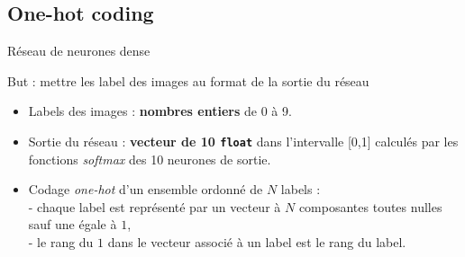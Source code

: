 \documentclass[10pt,serif,mathserif,compress,hyperref={colorlinks}]{beamer}
\begin{document}
\subsection{One-hot coding}

\begin{frame}{Réseau de neurones dense}

  \begin{tcolorbox}[title=Codage {\em One-hot} des labels]  

    But : mettre les label des images au format de la sortie du réseau

    {\small
        \begin{itemize}
        \item Labels des images  : \textbf{nombres entiers} de 0 à 9.
        \item Sortie du réseau : \textbf{vecteur de 10 \texttt{float}} dans l'intervalle [0,1] calculés par les fonctions {\em softmax} des 10 neurones de sortie.
        \item Codage {\em one-hot} d'un ensemble ordonné de $N$ labels : \\[1mm]
          - chaque label est représenté par un vecteur à $N$ composantes toutes nulles sauf une égale à $1$,\\
          - le rang du $1$ dans le vecteur associé à un label est le rang du label.
        \end{itemize}
      }
  \end{tcolorbox}  


\end{frame}
\end{document}
